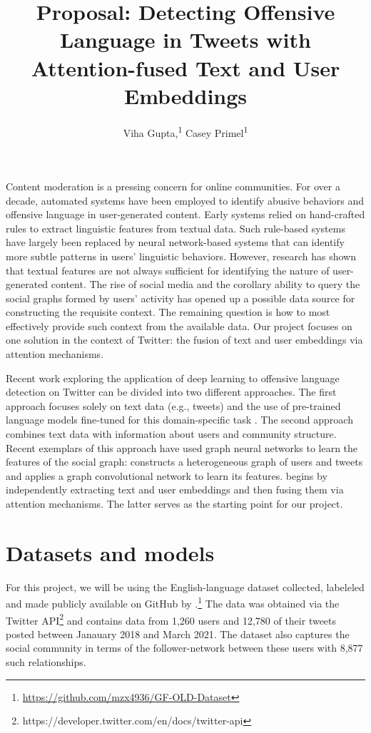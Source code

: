 \documentclass[letterpaper]{article} %
\title{Proposal: Detecting Offensive Language in Tweets with Attention-fused Text and User Embeddings}
\author {
    Viha Gupta,\textsuperscript{\rm 1}
    Casey Primel\textsuperscript{\rm 1}
}
\begin{document}
\maketitle


Content moderation is a pressing concern for online communities. For over a decade, automated systems have been employed to identify abusive behaviors and offensive language in user-generated content. Early systems relied on hand-crafted rules to extract linguistic features from textual data. Such rule-based systems have largely been replaced by neural network-based systems that can identify more subtle patterns in users' linguistic behaviors. However, research has shown that textual features are not always sufficient for identifying the nature of user-generated content. The rise of social media and the corollary ability to query the social graphs formed by users' activity has opened up a possible data source for constructing the requisite context. The remaining question is how to most effectively provide such context from the available data. Our project focuses on one solution in the context of Twitter: the fusion of text and user embeddings via attention mechanisms.

Recent work exploring the application of deep learning to offensive language detection on Twitter can be divided into two different approaches. The first approach focuses solely on text data (e.g., tweets) and the use of pre-trained language models fine-tuned for this domain-specific task \citep{liu2019-nuli}. The second approach combines text data with information about users and community structure. Recent exemplars of this approach have used graph neural networks to learn the features of the social graph: \citet{Mishra2019} constructs a heterogeneous graph of users and tweets and applies a graph convolutional network to learn its features. \citet{Miao2022} begins by independently extracting text and user embeddings and then fusing them via attention mechanisms. The latter serves as the starting point for our project.

\section{Datasets and models}

For this project, we will be using the English-language dataset collected, labeleled and made publicly available on GitHub by \citet{Miao2022}.\footnote{\url{https://github.com/mzx4936/GF-OLD-Dataset}} The data was obtained via the Twitter API\footnote{https://developer.twitter.com/en/docs/twitter-api} and contains data from 1,260 users and 12,780 of their tweets posted between Janauary 2018 and March 2021. The dataset also captures the social community in terms of the follower-network between these users with 8,877 such relationships.  
\end{document}
